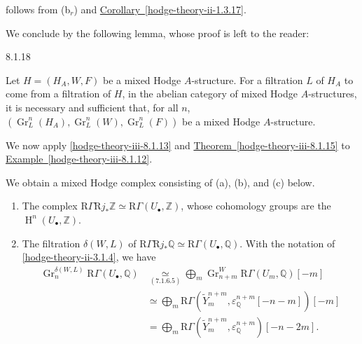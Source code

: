     follows from (b\({}_r\)) and \hyperref[hodge-theory-ii-1.3.17]{Corollary~\ref*{hodge-theory-ii-1.3.17}}.\par{}We conclude by the following lemma, whose proof is left to the reader:\begin{lemma}{8.1.18}\label{hodge-theory-iii-8.1.18}\skipsinglepar\par{}Let \(H=(H_A,W,F)\) be a mixed Hodge \(A\)-structure.
    For a filtration \(L\) of \(H_A\) to come from a filtration of \(H\), in the abelian category of mixed Hodge \(A\)-structures, it is necessary and sufficient that, for all \(n\), \((\operatorname {Gr}_L^n(H_A),\operatorname {Gr}_L^n(W),\operatorname {Gr}_L^n(F))\) be a mixed Hodge \(A\)-structure.\end{lemma}\label{hodge-theory-iii-8.1.19}\par{}We now apply \cref{hodge-theory-iii-8.1.13} and \hyperref[hodge-theory-iii-8.1.15]{Theorem~\ref*{hodge-theory-iii-8.1.15}} to \hyperref[hodge-theory-iii-8.1.12]{Example~\ref*{hodge-theory-iii-8.1.12}}.\par{}We obtain a mixed Hodge complex consisting of (a), (b), and (c) below.\begin{enumerate}
    
 \item[(a)]
      The complex \(\mathrm {R}\Gamma \mathrm {R} j_*\mathbb {Z}\simeq \mathrm {R}\Gamma (U_\bullet ,\mathbb {Z})\), whose cohomology groups are the \(\operatorname {H}^n(U_\bullet ,\mathbb {Z})\).
    


    
 \item[(b)]
      The filtration \(\delta (W,L)\) of \(\mathrm {R}\Gamma \mathrm {R} j_*\mathbb {Q}\simeq \mathrm {R}\Gamma (U_\bullet ,\mathbb {Q})\).
      With the notation of \cref{hodge-theory-ii-3.1.4}, we have
      \[         \begin {aligned}           \operatorname {Gr}_n^{\delta (W,L)}\mathrm {R}\Gamma (U_\bullet ,\mathbb {Q})           &\underset {(7.1.6.5)}{\simeq } \bigoplus _m \operatorname {Gr}_{n+m}^W \mathrm {R}\Gamma (U_m,\mathbb {Q})[-m]         \\&\simeq  \bigoplus _m \mathrm {R}\Gamma (\widetilde {Y}_m^{n+m},\varepsilon _\mathbb {Q}^{n+m}[-n-m])[-m]         \\&= \bigoplus _m \mathrm {R}\Gamma (\widetilde {Y}_m^{n+m},\varepsilon _\mathbb {Q}^{n+m})[-n-2m].         \end {aligned}       \]
      

\end{enumerate}
